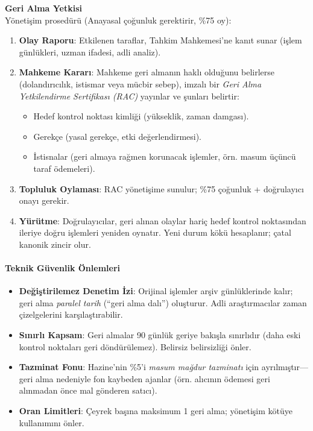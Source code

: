 \documentclass[11pt]{article}
\begin{document}
\textbf{Geri Alma Yetkisi}\\
Yönetişim prosedürü (Anayasal çoğunluk gerektirir, \%75 oy):
\begin{enumerate}[noitemsep]
  \item \textbf{Olay Raporu}: Etkilenen taraflar, Tahkim Mahkemesi'ne kanıt sunar (işlem günlükleri, uzman ifadesi, adli analiz).
  \item \textbf{Mahkeme Kararı}: Mahkeme geri almanın haklı olduğunu belirlerse (dolandırıcılık, istismar veya mücbir sebep), imzalı bir \emph{Geri Alma Yetkilendirme Sertifikası (RAC)} yayınlar ve şunları belirtir:
    \begin{itemize}[noitemsep]
      \item Hedef kontrol noktası kimliği (yükseklik, zaman damgası).
      \item Gerekçe (yasal gerekçe, etki değerlendirmesi).
      \item İstisnalar (geri almaya rağmen korunacak işlemler, örn. masum üçüncü taraf ödemeleri).
    \end{itemize}
  \item \textbf{Topluluk Oylaması}: RAC yönetişime sunulur; \%75 çoğunluk + doğrulayıcı onayı gerekir.
  \item \textbf{Yürütme}: Doğrulayıcılar, geri alınan olaylar hariç hedef kontrol noktasından ileriye doğru işlemleri yeniden oynatır. Yeni durum kökü hesaplanır; çatal kanonik zincir olur.
\end{enumerate}

\paragraph{Teknik Güvenlik Önlemleri}
\begin{itemize}[noitemsep]
  \item \textbf{Değiştirilemez Denetim İzi}: Orijinal işlemler arşiv günlüklerinde kalır; geri alma \emph{paralel tarih} (``geri alma dalı'') oluşturur. Adli araştırmacılar zaman çizelgelerini karşılaştırabilir.
  \item \textbf{Sınırlı Kapsam}: Geri almalar 90 günlük geriye bakışla sınırlıdır (daha eski kontrol noktaları geri döndürülemez). Belirsiz belirsizliği önler.
  \item \textbf{Tazminat Fonu}: Hazine'nin \%5'i \emph{masum mağdur tazminatı} için ayrılmıştır—geri alma nedeniyle fon kaybeden ajanlar (örn. alıcının ödemesi geri alınmadan önce mal gönderen satıcı).
  \item \textbf{Oran Limitleri}: Çeyrek başına maksimum 1 geri alma; yönetişim kötüye kullanımını önler.
\end{itemize}
\end{document}
